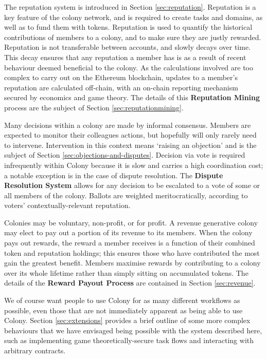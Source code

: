 The reputation system is introduced in Section \ref{sec:reputation}. Reputation is a key feature of the colony network, and is required to create tasks and domains, as well as to fund them with tokens. Reputation is used to quantify the historical contributions of members to a colony, and to make sure they are justly rewarded. Reputation is not transferable between accounts, and slowly decays over time. This decay ensures that any reputation a member has is as a result of recent behaviour deemed beneficial to the colony. As the calculations involved are too complex to carry out on the Ethereum blockchain, updates to a member's reputation are calculated off-chain, with an on-chain reporting mechanism secured by economics and game theory. The details of this \textbf{Reputation Mining} process are the subject of Section \ref{sec:reputationmining}.

Many decisions within a colony are made by informal consensus. Members are expected to monitor their colleagues actions, but hopefully will only rarely need to intervene. Intervention in this context means `raising an objection' and is the subject of Section \ref{sec:objections-and-disputes}. Decision via vote is required infrequently within Colony because it is slow and carries a high coordination cost; a notable exception is in the case of dispute resolution. The \textbf{Dispute Resolution System} allows for any decision to be escalated to a vote of some or all members of the colony. Ballots are weighted meritocratically, according to voters' contextually-relevant reputation.

Colonies may be voluntary, non-profit, or for profit. A revenue generative colony may elect to pay out a portion of its revenue to its members. When the colony pays out rewards, the reward a member receives is a function of their combined token and reputation holdings; this ensures those who have contributed the most gain the greatest benefit. Members maximise rewards by contributing to a colony over its whole lifetime rather than simply sitting on accumulated tokens. The details of the \textbf{Reward Payout Process} are contained in Section \ref{sec:revenue}.

We of course want people to use Colony for as many different workflows as possible, even those that are not immediately apparent as being able to use Colony. Section \ref{sec:extensions} provides a brief outline of some more complex behaviours that we have envisaged being possible with the system described here, such as implementing game theoretically-secure task flows and interacting with arbitrary contracts.

